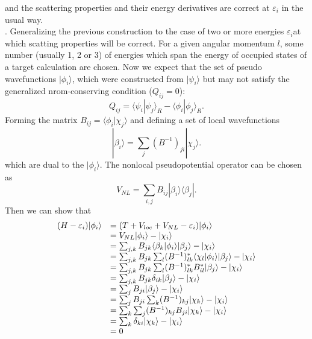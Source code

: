 \documentclass[UTF8]{ctexart}
\begin{document}
            and the scattering properties and their energy derivatives are correct at $\varepsilon_i$ in the usual way.\\
            . Generalizing the previous construction to the case of two or more energies $\varepsilon_i$at which scatting properties will be correct. For a given
            angular momentum $l$, some number (usually 1, 2 or 3) of energies which span the energy of occupied states of a target calculation are chosen. Now we expect that
            the set of pseudo wavefunctions $|\phi_i\rangle$, which were constructed from $|\psi_i\rangle$ but may not satisfy the generalized nrom-conserving condition ($Q_{ij}=0$):
            \begin{equation}
                Q_{ij}=\langle\psi_i|\psi_j\rangle_R-\langle\phi_i|\phi_j\rangle_R.
            \end{equation}
            Forming the matrix $B_{ij}=\langle\phi_i|\chi_j\rangle$ and defining a set of local wavefunctions
            \begin{equation}
                |\beta_i\rangle=\sum_j(B^{-1})_{ji}|\chi_j\rangle.
            \end{equation}
            which are dual to the $|\phi_i\rangle$. The nonlocal pseudopotential operator can be chosen as
            \begin{equation}
                V_{NL}=\sum_{i,j}B_{ij}|\beta_i\rangle\langle\beta_j|.
            \end{equation}
            Then we can show that
            \begin{equation}
                \begin{array}[h]{ll}
                    (H-\varepsilon_i)|\phi_i\rangle&=(T+V_{loc}+V_{NL}-\varepsilon_i)|\phi_i\rangle\\
                    &=V_{NL}|\phi_i\rangle-|\chi_i\rangle\\
                    &=\sum_{j,k}B_{jk}\langle\beta_k|\phi_i\rangle|\beta_j\rangle-|\chi_i\rangle\\
                    &=\sum_{j,k}B_{jk}\sum_l(B^{-1})^*_{lk}\langle\chi_l|\phi_i\rangle|\beta_j\rangle-|\chi_i\rangle\\
                    &=\sum_{j,k}B_{jk}\sum_l(B^{-1})^*_{lk}B_{il}^*|\beta_j\rangle-|\chi_i\rangle\\
                    &=\sum_{j,k}B_{jk}\delta_{ik}|\beta_j\rangle-|\chi_i\rangle\\
                    &=\sum_{j}B_{ji}|\beta_j\rangle-|\chi_i\rangle\\
                    &=\sum_{j}B_{ji}\sum_k(B^{-1})_{kj}|\chi_k\rangle-|\chi_i\rangle\\
                    &=\sum_{k}\sum_j(B^{-1})_{kj}B_{ji}|\chi_k\rangle-|\chi_i\rangle\\
                    &=\sum_{k}\delta_{ki}|\chi_k\rangle-|\chi_i\rangle\\
                    &=0
                \end{array}
            \end{equation}
\end{document}
